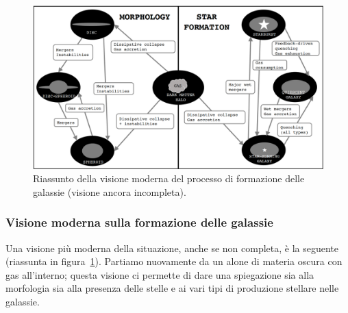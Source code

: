 \begin{figure}
    \centering
    \includegraphics[width = \textwidth]{immagini/formazione-delle-galassie-visione-moderna.png}
    \caption{Riassunto della visione moderna del processo di formazione delle galassie (visione ancora incompleta).}
    \label{fig:formazione-delle-galassie-visione-moderna}
\end{figure}

\subsubsection{Visione moderna sulla formazione delle galassie}
Una visione più moderna della situazione, anche se non completa, è la seguente (riassunta in figura~\ref{fig:formazione-delle-galassie-visione-moderna}). Partiamo nuovamente da un alone di materia oscura con gas all’interno; questa visione ci permette di dare una spiegazione sia alla morfologia sia alla presenza delle stelle e ai vari tipi di produzione stellare nelle galassie.

